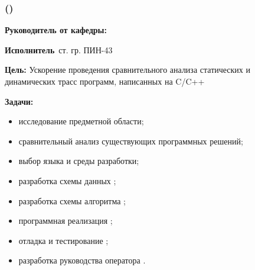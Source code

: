 \begin{frame}
    \frametitle{\textbf{\thesisTitle} ({\ProgModule})}
\textbf{Руководитель от кафедры:}~\supervisorRegaliaShort~\supervisorFioShort

\textbf{Исполнитель}~ст. гр. ПИН-43~\thesisAuthorShort

\textbf{Цель:} Ускорение проведения сравнительного анализа статических и динамических трасс программ, написанных на C/C++

\textbf{Задачи:}
\begin{itemize}
    \item исследование предметной области;
    \item сравнительный анализ существующих программных решений;
    \item выбор языка и среды разработки;
    \item разработка схемы данных {\ProgModule};
    \item разработка схемы алгоритма {\ProgModule};
    \item программная реализация {\ProgModule};
    \item отладка и тестирование {\ProgModule};
    \item разработка руководства оператора {\ProgModule}.
\end{itemize}
\end{frame}
